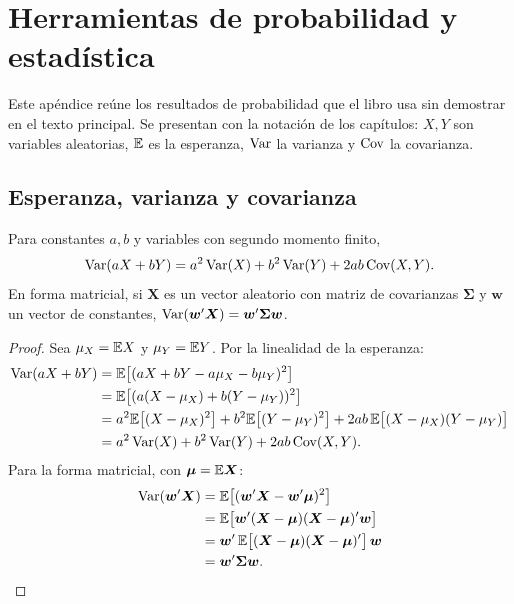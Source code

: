 \appendix

\chapter{Herramientas de probabilidad y estadística}\label{ap:prob}

Este apéndice reúne los resultados de probabilidad que el libro usa sin demostrar en el texto
principal. Se presentan con la notación de los capítulos: $X,Y$ son variables aleatorias, $\mathbb{E}$ es la
esperanza, $\operatorname{Var}$ la varianza y $\operatorname{Cov}$ la covarianza.

\section{Esperanza, varianza y covarianza}

\begin{proposicion}\label{prop:ap-var}
Para constantes $a,b$ y variables con segundo momento finito,
\[
  \operatorname{Var}(aX+bY)=a^2\operatorname{Var}(X)+b^2\operatorname{Var}(Y)+2ab\operatorname{Cov}(X,Y).
\]
En forma matricial, si $\bm X$ es un vector aleatorio con matriz de covarianzas $\bm\Sigma$ y $\bm w$ un
vector de constantes, $\operatorname{Var}(\bm w'\bm X)=\bm w'\bm\Sigma\bm w$.
\end{proposicion}

\begin{proof}
Sea $\mu_X=\mathbb{E} X$ y $\mu_Y=\mathbb{E} Y$. Por la linealidad de la esperanza:
\begin{align*}
  \operatorname{Var}(aX+bY) &= \mathbb{E}\bigl[(aX+bY-a\mu_X-b\mu_Y)^2\bigr]\\
              &= \mathbb{E}\bigl[(a(X-\mu_X)+b(Y-\mu_Y))^2\bigr]\\
              &= a^2\mathbb{E}\bigl[(X-\mu_X)^2\bigr]+b^2\mathbb{E}\bigl[(Y-\mu_Y)^2\bigr]+2ab\,\mathbb{E}\bigl[(X-\mu_X)(Y-\mu_Y)\bigr]\\
              &= a^2\operatorname{Var}(X)+b^2\operatorname{Var}(Y)+2ab\operatorname{Cov}(X,Y).
\end{align*}
Para la forma matricial, con $\bm\mu=\mathbb{E}\bm X$:
\begin{align*}
  \operatorname{Var}(\bm w'\bm X) &= \mathbb{E}\bigl[(\bm w'\bm X-\bm w'\bm\mu)^2\bigr]\\
                    &= \mathbb{E}\bigl[\bm w'(\bm X-\bm\mu)(\bm X-\bm\mu)'\bm w\bigr]\\
                    &= \bm w'\,\mathbb{E}\bigl[(\bm X-\bm\mu)(\bm X-\bm\mu)'\bigr]\,\bm w\\
                    &= \bm w'\bm\Sigma\bm w. \qedhere
\end{align*}
\end{proof}

